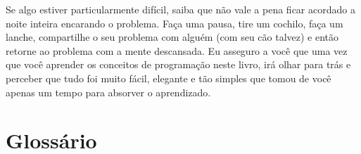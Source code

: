 Se algo estiver particularmente difícil, saiba que não vale a pena ficar acordado
a noite inteira encarando o problema. Faça uma pausa, tire um cochilo, faça um lanche,
compartilhe o seu problema com alguém (com seu cão talvez) e então retorne ao 
problema com a mente descansada. Eu asseguro a você que uma vez que você aprender
os conceitos de programação neste livro, irá olhar para trás e perceber que tudo foi
muito fácil, elegante e tão simples que tomou de você apenas um tempo para absorver
o aprendizado.
%

\section{Glossário}
%

